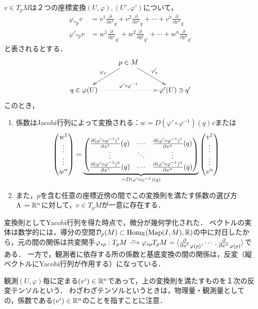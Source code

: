 \documentclass[uplatex,dvipdfmx]{jsreport}
\begin{document}
\begin{proposition}[接ベクトルの変換]\label{prop-transformation-of-tangent-vector}
    $v\in T_pM$は２つの座標変換$(U,\varphi),(U',\varphi')$について，
    \begin{align*}
        \varphi_{*p}v&=v^1\frac{\partial}{\partial x^1}_q+v^2\frac{\partial}{\partial x^2}_q+\cdots+v^n\frac{\partial}{\partial x^n}_q\\
        \varphi'_{*p}v&=w^1\frac{\partial}{\partial y^1}_{q'}+w^2\frac{\partial}{\partial y^2}_{q'}+\cdots+w^n\frac{\partial}{\partial y^n}_{q'}
    \end{align*}
    と表されるとする．
    \[\xymatrix{
        &p\in M\ar[dl]_-{\varphi_x}\ar[dr]^-{\varphi'_y}\\
        q\in\varphi(U)\ar@{.>}[rr]^-{\varphi'\circ\varphi^{-1}}&&\varphi'(U)\ni q'
    }\]
    このとき，
    \begin{enumerate}
        \item 係数はJacobi行列によって変換される：$w=D(\varphi'\circ\varphi^{-1})(q)v$または
        \[\begin{pmatrix}w^1\\\vdots\\\vdots\\w^n\end{pmatrix}=\underbrace{\begin{pmatrix}\frac{\partial (\varphi'\circ\varphi^{-1})^1}{\partial x^1}(q)&\cdots&\frac{\partial (\varphi'\circ\varphi^{-1})^1}{\partial x^n}(q)\\\vdots&\ddots&\vdots\\\frac{\partial (\varphi'\circ\varphi^{-1})^n}{\partial x^1}(q)&\cdots&\frac{\partial (\varphi'\circ\varphi^{-1})^n}{\partial x^n}(q)\end{pmatrix}}_{=D(\varphi'\circ\varphi^{-1})(q)}\begin{pmatrix}v^1\\\vdots\\\vdots\\v^n\end{pmatrix}\]
        \item また，$p$を含む任意の座標近傍の間でこの変換則を満たす係数の選び方$\Lambda\nrightarrow\mathbb{R}^n$に対して，$v\in T_pM$が一意に存在する．
    \end{enumerate}
\end{proposition}
\begin{remarks}[反変1-テンソルの変換則]
    変換則としてYacobi行列を得た時点で，微分が幾何学化された．
    ベクトルの実体は数学的には，導分の空間$\mathcal{D}_p(M)\subset\mathrm{Hom}_{\mathbb{R}}(\mathrm{Map}(I,M),\mathbb{R})$の中に対日したから，元の間の関係は共変関手$\varphi_{*p}:T_pM\iso\varphi_{*p}T_pM=\bracket{\frac{\partial}{\partial x^1}_{\varphi(p)},\cdots,\frac{\partial}{\partial x^n}_{\varphi(p)}}$である．
    一方で，観測者に依存する所の係数と基底変換の間の関係は，反変（縦ベクトルにYacobi行列が作用する）になっている．

    観測$(U,\varphi)$毎に定まる$(v^i)\in\mathbb{R}^n$であって，上の変換則を満たすものを１次の反変テンソルという．
    わざわざテンソルというときは，物理量・観測量としての，係数である$(v^i)\in\mathbb{R}^n$のことを指すことに注意．
\end{remarks}
\end{document}
